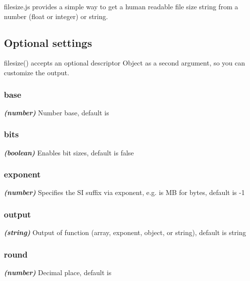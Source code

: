 \href{http://travis-ci.org/avoidwork/filesize.js}{\tt } \href{https://gitter.im/avoidwork/filesize.js?utm_source=badge&utm_medium=badge&utm_campaign=pr-badge&utm_content=badge}{\tt }

filesize.\+js provides a simple way to get a human readable file size string from a number (float or integer) or string.

\subsection*{Optional settings}

{\ttfamily filesize()} accepts an optional descriptor Object as a second argument, so you can customize the output.

\subsubsection*{base}

{\itshape {\itshape {\bfseries (number)}}} Number base, default is {}

\subsubsection*{bits}

{\itshape {\itshape {\bfseries (boolean)}}} Enables {\ttfamily bit} sizes, default is {\ttfamily false}

\subsubsection*{exponent}

{\itshape {\itshape {\bfseries (number)}}} Specifies the SI suffix via exponent, e.\+g. {} is {\ttfamily MB} for bytes, default is {\ttfamily -\/1}

\subsubsection*{output}

{\itshape {\itshape {\bfseries (string)}}} Output of function ({\ttfamily array}, {\ttfamily exponent}, {\ttfamily object}, or {\ttfamily string}), default is {\ttfamily string}

\subsubsection*{round}

{\itshape {\itshape {\bfseries (number)}}} Decimal place, default is {}

